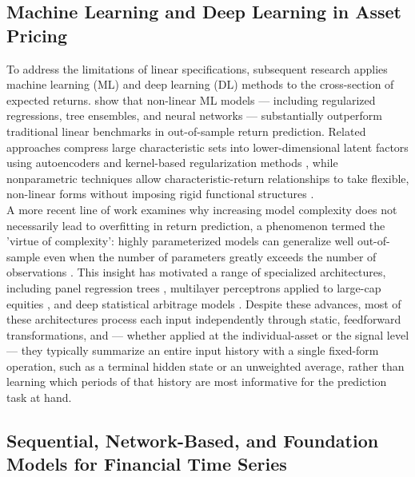 \documentclass[pdflatex,sn-mathphys-num]{sn-jnl}%
\theoremstyle{thmstyleone}%
\theoremstyle{thmstyletwo}%
\theoremstyle{thmstylethree}%
\begin{document}
\subsection{Machine Learning and Deep Learning in Asset Pricing}
To address the limitations of linear specifications, subsequent research applies machine learning (ML) and deep learning (DL) methods to the cross-section of expected returns. \citet{gu2020empirical} show that non-linear ML models — including regularized regressions, tree ensembles, and neural networks — substantially outperform traditional linear benchmarks in out-of-sample return prediction. Related approaches compress large characteristic sets into lower-dimensional latent factors using autoencoders \cite{gu2021autoencoder,chen2024deep} and kernel-based regularization methods \cite{kozak2020shrinking}, while nonparametric techniques allow characteristic-return relationships to take flexible, non-linear forms without imposing rigid functional structures \cite{freyberger2020dissecting, avramov2023machine}.\\

A more recent line of work examines why increasing model complexity does not necessarily lead to overfitting in return prediction, a phenomenon termed the 'virtue of complexity': highly parameterized models can generalize well out-of-sample even when the number of parameters greatly exceeds the number of observations \cite{kelly2024virtue}. This insight has motivated a range of specialized architectures, including panel regression trees \cite{cong2025growing}, multilayer perceptrons applied to large-cap equities \cite{lai2025multilayer}, and deep statistical arbitrage models \cite{guijarro2025deep}. Despite these advances, most of these architectures process each input independently through static, feedforward transformations, and — whether applied at the individual-asset or the signal level — they typically summarize an entire input history with a single fixed-form operation, such as a terminal hidden state or an unweighted average, rather than learning which periods of that history are most informative for the prediction task at hand.\\

\subsection{Sequential, Network-Based, and Foundation Models for Financial Time Series}
\end{document}
